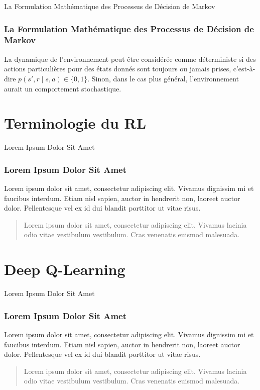 \documentclass[serif, aspectratio=169]{beamer}
\begin{document}
\begin{frame}{La Formulation Mathématique des Processus de Décision de Markov}
	\frametitle{La Formulation Mathématique des Processus de Décision de Markov}
		
		La dynamique de l'environnement peut être considérée comme déterministe si des actions particulières pour des états donnés sont toujours ou jamais prises, c'est-à-dire \(p(s', r \mid s, a) \in \{0,1\}\). Sinon, dans le cas plus général, l'environnement aurait un comportement stochastique.
		
\end{frame}


\section{Terminologie du RL}

\begin{frame}{Lorem Ipsum Dolor Sit Amet}
	\frametitle{Lorem Ipsum Dolor Sit Amet}
	
	Lorem ipsum dolor sit amet, consectetur adipiscing elit. Vivamus dignissim mi et faucibus interdum. Etiam nisl sapien, auctor in hendrerit non, laoreet auctor dolor. Pellentesque vel ex id dui blandit porttitor ut vitae risus.
	
	\vspace{20pt}
	
	\begin{quote}
		Lorem ipsum dolor sit amet, consectetur adipiscing elit. Vivamus lacinia odio vitae vestibulum vestibulum. Cras venenatis euismod malesuada.
	\end{quote}
	
\end{frame}


\section{Deep Q-Learning}

\begin{frame}{Lorem Ipsum Dolor Sit Amet}
	\frametitle{Lorem Ipsum Dolor Sit Amet}
	
	Lorem ipsum dolor sit amet, consectetur adipiscing elit. Vivamus dignissim mi et faucibus interdum. Etiam nisl sapien, auctor in hendrerit non, laoreet auctor dolor. Pellentesque vel ex id dui blandit porttitor ut vitae risus.
	
	\vspace{20pt}
	
	\begin{quote}
		Lorem ipsum dolor sit amet, consectetur adipiscing elit. Vivamus lacinia odio vitae vestibulum vestibulum. Cras venenatis euismod malesuada.
	\end{quote}
	
\end{frame}
\end{document}
